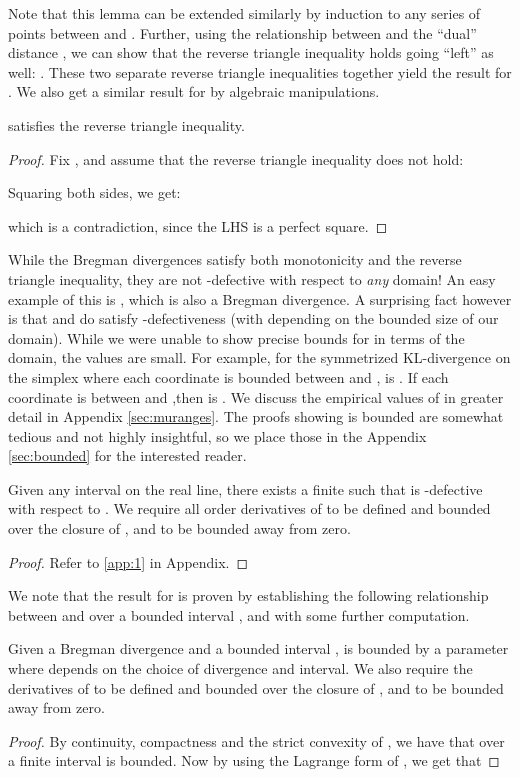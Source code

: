 \documentclass[11pt]{myclass}
\begin{document}
Note that this lemma can be extended similarly by induction to any series of  points between  and .
 Further, using the relationship between  and the ``dual'' distance  , we can show that the reverse triangle inequality holds going ``left'' as well:  
. These two separate reverse triangle inequalities together yield the result for  . We also
get a similar result for  by algebraic manipulations.



\begin{lemma}\label{Aklreverse}
 satisfies the reverse triangle inequality.
\end{lemma}
\begin{proof}

Fix , and assume that the reverse triangle inequality does not hold:


Squaring both sides, we get:

which is a contradiction, since the LHS is a perfect square.
\end{proof}

 While the Bregman divergences satisfy both monotonicity and the reverse triangle inequality,
 they are not -defective with respect to \emph{any} domain! An easy example of this is , which is also a Bregman divergence.
A surprising fact however is that  and  do satisfy -defectiveness (with  depending on the bounded size of our domain). While we were unable to show precise bounds for  in terms of the domain, the values are small.  For example, for the symmetrized KL-divergence on the simplex where each coordinate is bounded between  and ,  is . If each coordinate is between  and ,then  is . We discuss the
empirical values of  in greater detail in Appendix \ref{sec:muranges}. The proofs showing  is bounded are somewhat tedious and not highly insightful, so we place those in the Appendix \ref{sec:bounded} for the interested reader.


\begin{lemma}\label{Arootmu}
Given any interval  on the real line, there exists a finite  such that   is -defective with respect to . We require 
all order derivatives of  to be defined and bounded over the closure of , and  to be bounded away from zero.
\end{lemma}

\begin{proof}
Refer to \ref{app:1} in Appendix.
\end{proof}

We note that the result for  is proven by establishing the
 following relationship between  and  over a bounded interval , and with some
further computation. 
\begin{lemma}\label{firstTosecond}
Given a Bregman divergence  and a bounded interval ,  is 
bounded by a parameter    where  depends on the choice of divergence and interval. We also require 
the derivatives of  to be defined and bounded over the closure of , and  to be bounded away from zero.
\end{lemma}
\begin{proof}
By continuity, compactness and the strict convexity of , we have that over a finite interval   is bounded.
 Now by using the Lagrange form of , we get that 
\end{proof}
\end{document}
